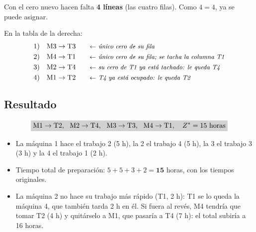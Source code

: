 \documentclass[11pt,a4paper]{article}
\let\pasobase\paso
\renewcommand{\paso}[1]{\needspace{7\baselineskip}\pasobase{#1}}
\newcommand{\marco}[3]{%
  \foreach \i in {2,...,#2} \foreach \j in {2,...,#3}
    \draw[gray!60, very thin] (#1-\i-\j.north west) rectangle (#1-\i-\j.south east);
  \draw[semithick] (#1-2-2.north west) rectangle (#1-#2-#3.south east);}
\newcommand{\tfila}[3]{\draw[tapa] (#1-#2-2.west) -- (#1-#2-#3.east);}
\newcommand{\pie}[2]{\node[below=1.5mm of #1, font=\scriptsize\itshape] {#2};}
\newcommand{\cero}[1]{\node[asig] at (#1) {};}
\newcommand{\flecha}[3]{\draw[-{Stealth[length=2.4mm]}, thick, shorten >=1mm] (#1.east) -- node[above, font=\scriptsize, align=center] {#3} (#1.east -| #2.west);}
\begin{document}
\begin{center}
\end{center}
Con el cero nuevo hacen falta \textbf{4 líneas} (las cuatro filas). Como $4 = 4$, ya se puede asignar.

En la tabla de la derecha:
\begin{align*}
1)\quad & \text{M3} \to \text{T3} \nota{único cero de su fila}\\
2)\quad & \text{M4} \to \text{T1} \nota{único cero de su fila; se tacha la columna T1}\\
3)\quad & \text{M2} \to \text{T4} \nota{su cero de T1 ya está tachado: le queda T4}\\
4)\quad & \text{M1} \to \text{T2} \nota{T4 ya está ocupado: le queda T2}
\end{align*}

\subsection*{Resultado}
\[
\res{\text{M1} \to \text{T2},\ \ \text{M2} \to \text{T4},\ \ \text{M3} \to \text{T3},\ \ \text{M4} \to \text{T1},\quad Z^* = 15 \text{ horas}}
\]
\begin{itemize}[itemsep=2pt]
  \item La máquina 1 hace el trabajo 2 (5 h), la 2 el trabajo 4 (5 h), la 3 el trabajo 3 (3 h) y la 4 el trabajo 1 (2 h).
  \item Tiempo total de preparación: $5 + 5 + 3 + 2 = \mathbf{15}$ horas, con los tiempos originales.
  \item La máquina 2 no hace su trabajo más rápido (T1, 2 h): T1 se lo queda la máquina 4, que también tarda 2 h en
        él. Si fuera al revés, M4 tendría que tomar T2 (4 h) y quitárselo a M1, que pasaría a T4 (7 h): el total
        subiría a 16 horas.
\end{itemize}
\end{document}
